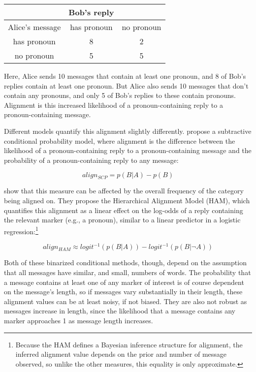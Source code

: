 \documentclass[11pt]{article}
\begin{document}
\begin{center}
\begin{tabular}{|c||c|c|}
\hline 
& Bob's reply & \\
\hline
Alice's message & has pronoun & no pronoun \\
has pronoun & 8 & 2\\
no pronoun & 5 & 5\\
\hline
\end{tabular}
\end{center}

Here, Alice sends 10 messages that contain at least one pronoun, and 8 of Bob's replies contain at least one pronoun.  But Alice also sends 10 messages that don't contain any pronouns, and only 5 of Bob's replies to these contain pronouns. Alignment is this increased likelihood of a pronoun-containing reply to a pronoun-containing message.

Different models quantify this alignment slightly differently.  \cite{DNMGamonDumais2011} propose a subtractive conditional probability model, where alignment is the difference between the likelihood of a pronoun-containing reply to a pronoun-containing message and the probability of a pronoun-containing reply to any message:

\begin{equation}
align_{SCP} = p(B|A) - p(B)
\end{equation}

\cite{DoyleYurovskyFrank2016} show that this measure can be affected by the overall frequency of the category being aligned on. They propose the Hierarchical Alignment Model (HAM), which quantifies this alignment as a linear effect on the log-odds of a reply containing the relevant marker (e.g., a pronoun), similar to a linear predictor in a logistic regression:\footnote{Because the HAM defines a Bayesian inference structure for alignment, the inferred alignment value depends on the prior and number of message observed, so unlike the other measures, this equality is only approximate.}

\begin{equation}
align_{HAM} \approx logit^{-1}(p(B|A)) - logit^{-1}(p(B|\neg A))
\end{equation}

Both of these binarized conditional methods, though, depend on the assumption that all messages have similar, and small, numbers of words. The probability that a message contains at least one of any marker of interest is of course dependent on the message's length, so if messages vary substantially in their length, these alignment values can be at least noisy, if not biased. They are also not robust as messages increase in length, since the likelihood that a message contains any marker approaches 1 as message length increases.
\end{document}
